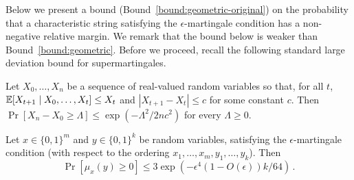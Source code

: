 Below we present a bound (Bound~\ref{bound:geometric-original}) on the probability that 
a characteristic string satisfying the $\epsilon$-martingale condition has a non-negative relative margin. 
We remark that the bound below is weaker than Bound~\ref{bound:geometric}. 
Before we proceed, recall 
the following standard large deviation bound for supermartingales.
\begin{theorem}\label{thm:azuma}
  Let $X_0, \ldots, X_n$ be a sequence of real-valued random variables
  so that, for all $t$,
  $\operatorname{\mathbb{E}}[X_{t+1} \mid X_0, \ldots, X_{t}] \leq X_t$ and
  $|X_{t+1} - X_t| \leq c$ for some constant $c$. Then  
  $
    \Pr[X_n - X_0 \geq \Lambda] \leq
    \exp\left(-{\Lambda^2}/{2nc^2}\right)
  $ 
  for every $\Lambda \geq 0$.
\end{theorem}

\begin{bound}\label{bound:geometric-original}
  Let $x \in \{0,1\}^m$ and $y \in \{0,1\}^k$ be random variables,
  satisfying the $\epsilon$-martingale condition (with respect to the ordering $x_1, \ldots, x_m, y_1, \ldots, y_k$). Then
  \[
    \Pr[\mu_x(y) \geq 0] \leq
    3 \exp\left( -\epsilon^4 (1 - O(\epsilon) ) k/64 \right)  
    \, .
  \]
\end{bound}



